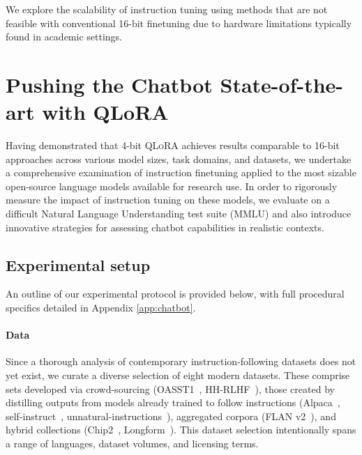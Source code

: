We explore the scalability of instruction tuning using methods that are not feasible with conventional 16-bit finetuning due to hardware limitations typically found in academic settings.

\section{Pushing the Chatbot State-of-the-art with QLoRA}
\label{sec:pushing}
Having demonstrated that 4-bit \textsc{QLoRA} achieves results comparable to 16-bit approaches across various model sizes, task domains, and datasets, we undertake a comprehensive examination of instruction finetuning applied to the most sizable open-source language models available for research use. In order to rigorously measure the impact of instruction tuning on these models, we evaluate on a difficult Natural Language Understanding test suite (MMLU) and also introduce innovative strategies for assessing chatbot capabilities in realistic contexts.

\subsection{Experimental setup} An outline of our experimental protocol is provided below, with full procedural specifics detailed in Appendix \ref{app:chatbot}.

\paragraph{Data} Since a thorough analysis of contemporary instruction-following datasets does not yet exist, we curate a diverse selection of eight modern datasets. These comprise sets developed via crowd-sourcing (OASST1~\citep{kopf2023openassistant}, HH-RLHF~\citep{bai2022training}), those created by distilling outputs from models already trained to follow instructions (Alpaca~\citep{alpaca}, self-instruct~\citep{wang2022self}, unnatural-instructions~\citep{honovich2022unnatural}), aggregated corpora (FLAN v2~\citep{chung2022scaling}), and hybrid collections (Chip2~\citep{laion2023}, Longform~\citep{koksal2023longform}). This dataset selection intentionally spans a range of languages, dataset volumes, and licensing terms.


